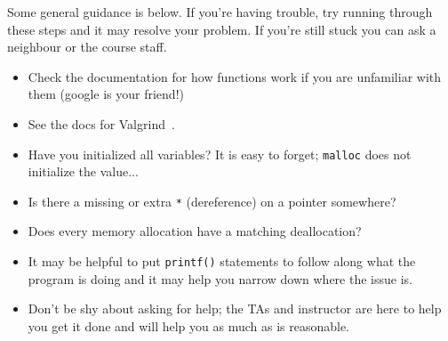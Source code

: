 Some general guidance is below. If you're having trouble, try running through these steps and it may resolve your problem. If you're still stuck you can ask a neighbour or the course staff.
\begin{itemize}
	\item Check the documentation for how functions work if you are unfamiliar with them (google is your friend!)
	\item See the docs for Valgrind~\cite{valgrind:tools}.
	\item Have you initialized all variables? It is easy to forget; \texttt{malloc} does not initialize the value...
	\item Is there a missing or extra \texttt{*} (dereference) on a pointer somewhere?
	\item Does every memory allocation have a matching deallocation?
	\item It may be helpful to put \texttt{printf()} statements to follow along what the program is doing and it may help you narrow down where the issue is.
	\item Don't be shy about asking for help; the TAs and instructor are here to help you get it done and will help you as much as is reasonable.
\end{itemize}




